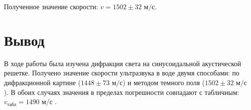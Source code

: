 \documentclass[a4paper,12pt]{article} %
\begin{document}
\noindent Полученное значение скорости: $v = 1502 \pm 32 \text{ м/с}$.


\section{Вывод}

В ходе работы была изучена дифракция света на синусоидальной акустической решетке. Получено значение скорости ультразвука в воде двумя способами: по дифракционной картине ($1448 \pm 73 \text{ м/с}$) и методом темного поля ($1502 \pm 32 \text{ м/с}$). В обоих случаях значения в пределах погрешности совпадают с табличным: $v_\text{табл} = 1490 \text{ м/с}$ .
 
\end{document}
